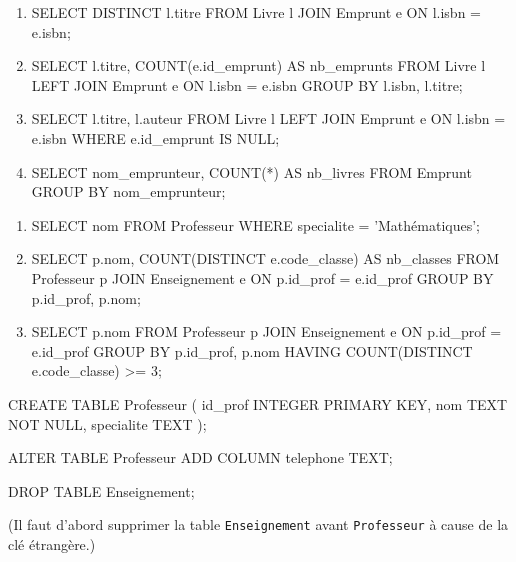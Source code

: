 \begin{enumerate}
    \item 
\begin{sqlcode}
SELECT DISTINCT l.titre
FROM Livre l
JOIN Emprunt e ON l.isbn = e.isbn;
\end{sqlcode}
    \item 
\begin{sqlcode}
SELECT l.titre, COUNT(e.id_emprunt) AS nb_emprunts
FROM Livre l
LEFT JOIN Emprunt e ON l.isbn = e.isbn
GROUP BY l.isbn, l.titre;
\end{sqlcode}
    \item 
\begin{sqlcode}
SELECT l.titre, l.auteur
FROM Livre l
LEFT JOIN Emprunt e ON l.isbn = e.isbn
WHERE e.id_emprunt IS NULL;
\end{sqlcode}
    \item 
\begin{sqlcode}
SELECT nom_emprunteur, COUNT(*) AS nb_livres
FROM Emprunt
GROUP BY nom_emprunteur;
\end{sqlcode}
\end{enumerate}

\begin{enumerate}
    \item 
\begin{sqlcode}
SELECT nom
FROM Professeur
WHERE specialite = 'Mathématiques';
\end{sqlcode}
    \item 
\begin{sqlcode}
SELECT p.nom, COUNT(DISTINCT e.code_classe) AS nb_classes
FROM Professeur p
JOIN Enseignement e ON p.id_prof = e.id_prof
GROUP BY p.id_prof, p.nom;
\end{sqlcode}
    \item 
\begin{sqlcode}
SELECT p.nom
FROM Professeur p
JOIN Enseignement e ON p.id_prof = e.id_prof
GROUP BY p.id_prof, p.nom
HAVING COUNT(DISTINCT e.code_classe) >= 3;
\end{sqlcode}
\end{enumerate}

\begin{sqlcode}
CREATE TABLE Professeur (
    id_prof INTEGER PRIMARY KEY,
    nom TEXT NOT NULL,
    specialite TEXT
);
\end{sqlcode}

\begin{sqlcode}
ALTER TABLE Professeur
ADD COLUMN telephone TEXT;
\end{sqlcode}

\begin{sqlcode}
DROP TABLE Enseignement;
\end{sqlcode}
(Il faut d'abord supprimer la table \texttt{Enseignement} avant \texttt{Professeur} à cause de la clé étrangère.)